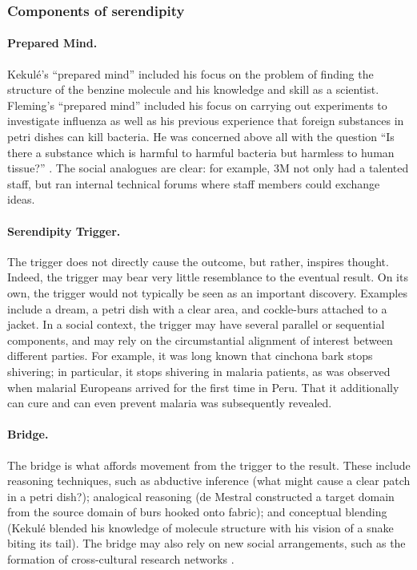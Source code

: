 \subsubsection*{Components of serendipity}

\paragraph{Prepared Mind.}

Kekul\'e's ``prepared mind'' included his focus on the problem of
finding the structure of the benzine molecule and his knowledge and
skill as a scientist.  Fleming's ``prepared mind'' included his focus
on carrying out experiments to investigate influenza as well as his
previous experience that foreign substances in petri dishes can kill
bacteria.  He was concerned above all with the question ``Is there a
substance which is harmful to harmful bacteria but harmless to human
tissue?''  \cite[p. 161]{roberts}.  The social analogues are clear:
for example, 3M not only had a talented staff, but ran internal
technical forums where staff members could exchange ideas.
 
\paragraph{Serendipity Trigger.}

The trigger does not directly cause the outcome, but rather, inspires
thought.  Indeed, the trigger may bear very little resemblance to the
eventual result.  On its own, the trigger would not typically be seen
as an important discovery.  Examples include a dream, a petri dish
with a clear area, and cockle-burs attached to a jacket.  In a social
context, the trigger may have several parallel or sequential
components, and may rely on the circumstantial alignment of interest
between different parties.  For example, it was long known that
cinchona bark stops shivering; in particular, it stops shivering in
malaria patients, as was observed when malarial Europeans arrived for
the first time in Peru.  That it additionally can cure and can even
prevent malaria was subsequently revealed.

\paragraph{Bridge.}

The bridge is what affords movement from the trigger to the result.
These include reasoning techniques, such as abductive inference (what
might cause a clear patch in a petri dish?); analogical reasoning (de
Mestral constructed a target domain from the source domain of burs
hooked onto fabric); and conceptual blending (Kekul\'e blended his
knowledge of molecule structure with his vision of a snake biting its
tail).  The bridge may also rely on new social arrangements, such as
the formation of cross-cultural research networks
\cite{companions-in-geography}.

